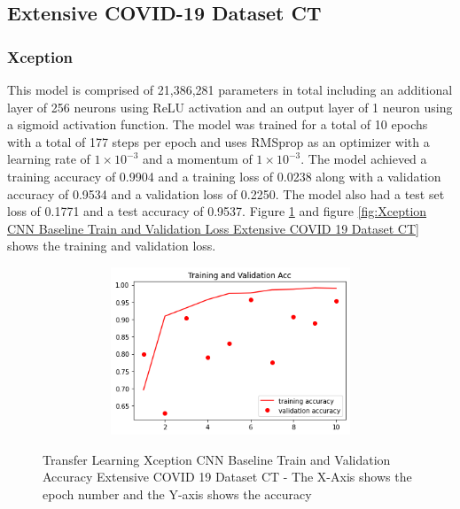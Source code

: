 \subsection{Extensive COVID-19 Dataset CT}
\subsubsection{Xception}
This model is comprised of 21,386,281 parameters in total including an additional layer of 256 neurons using ReLU activation and an output layer of 1 neuron using a sigmoid activation function.  The model was trained for a total of 10 epochs with a total of 177 steps per epoch and uses RMSprop as an optimizer with a learning rate of $1\times10^{-3}$ and a momentum of $1\times10^{-3}$.  The model achieved a training accuracy of 0.9904 and a training loss of 0.0238 along with a validation accuracy of 0.9534 and a validation loss of 0.2250.  The model also had a test set loss of 0.1771 and a test accuracy of 0.9537. Figure \ref{fig:Xception CNN Baseline Train and Validation Accuracy Extensive COVID 19 Dataset CT} and figure \ref{fig:Xception CNN Baseline Train and Validation Loss Extensive COVID 19 Dataset CT} shows the training and validation loss.
 \begin{figure}[H]
    \centering
    \includegraphics[width=1\textwidth,height=5cm,keepaspectratio]{Images/XceptionBaselineTrainingValidationAccuracyExtensiveCT.png}\\
    \caption{Transfer Learning Xception CNN Baseline Train and Validation Accuracy Extensive COVID 19 Dataset CT - The X-Axis shows the epoch number and the Y-axis shows the accuracy}
    \label{fig:Xception CNN Baseline Train and Validation Accuracy Extensive COVID 19 Dataset CT}
\end{figure}
